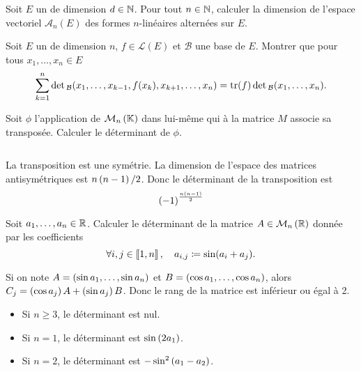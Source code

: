 \documentclass{magnolia}
\begin{document}




Soit $E$ un \Kev de dimension $d\in\mathbb{N}$. Pour tout $n\in\mathbb{N}$, calculer la dimension
de l'espace vectoriel $\mathcal{A}_n(E)$ des formes $n$-linéaires alternées sur $E$.


Soit $E$ un \Kev de dimension $n$, $f\in\mathcal{L}(E)$ et $\mathcal{B}$ une base
de $E$. Montrer que pour tous $x_1,\ldots,x_n\in E$
\[\sum_{k=1}^n \mathop{\rm det}{}_{\mathcal{B}}(x_1,\ldots,x_{k-1},f(x_k),x_{k+1},\ldots,x_n)=\operatorname{tr}(f)
  \mathop{\rm det}{}_{\mathcal{B}}(x_1,\ldots,x_n).\]


Soit $\phi$ l'application de $\mathcal{M}_{n}\left(\mathbb{K}\right)$ dans lui-même qui à la matrice $M$
associe sa transposée. Calculer le déterminant de $\phi$.
\begin{sol}
$\quad$
\begin{questions}
\question La transposition est une symétrie. La dimension de l'espace des
  matrices antisymétriques est $n\left(n-1\right)/2$. Donc le déterminant de la
  transposition est
  \[\left(-1\right)^{\frac{n\left(n-1\right)}{2}}\]
\end{questions}
\end{sol}


Soit $a_1,\ldots,a_n\in\mathbb{R}$. Calculer le déterminant de la matrice $A\in\mathcal{M}_{n}\left(\mathbb{R}\right)$
donnée par les coefficients
\[\forall i,j\in\left\llbracket 1,n\right\rrbracket,\quad a_{i,j}\coloneqq\sin(a_i+a_j).\]
\begin{sol}
Si on note $A=\left(\sin a_1,\ldots,\sin a_n\right)$ et
$B=\left(\cos a_1,\ldots,\cos a_n\right)$, alors $C_j=\left(\cos a_j\right)A+\left(\sin a_j\right)B$.
Donc le rang de la matrice est inférieur ou égal à 2.
\begin{itemize}
\item Si $n\geq 3$, le déterminant est nul.
\item Si $n=1$, le déterminant est $\sin\left(2a_1\right)$.
\item Si $n=2$, le déterminant est $-\sin^2\left(a_1-a_2\right)$.
\end{itemize}
\end{sol}
\end{document}
